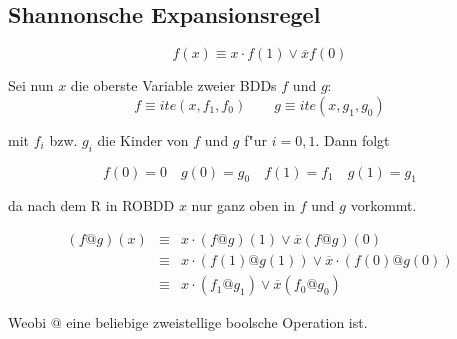 \documentclass[german, 10pt, a4paper, twocolumn]{scrartcl}
\theoremstyle{definition}
\begin{document}
\subsection{Shannonsche Expansionsregel}

\begin{displaymath}
	f(x) \equiv x \cdotp f(1) \lor \overline{x} f(0)
\end{displaymath}

Sei nun $x$ die oberste Variable zweier BDDs $f$ und $g$:
\begin{displaymath}
	f \equiv ite(x,f_1,f_0) \qquad g \equiv ite(x,g_1,g_0)
\end{displaymath}

mit $f_i$ bzw. $g_i$ die Kinder von $f$ und $g$ f"ur $i=0,1$. Dann folgt

\begin{displaymath}
	f(0) = 0 \quad g(0) = g_0 \quad f(1) = f_1 \quad g(1) = g_1
\end{displaymath}

da nach dem R in ROBDD $x$ nur ganz oben in $f$ und $g$ vorkommt.

\begin{eqnarray}
	(f @ g) (x) &	\equiv &	x \cdotp (f @ g)(1) \lor \overline{x}(f @ g)(0)\\
	&		\equiv &	x \cdotp (f(1)@ g(1))\lor \overline{x}\cdotp (f(0) @ g(0))\\
	&		\equiv &	x \cdotp (f_1 @ g_1) \lor \overline{x} (f_0 @ g_0)
\end{eqnarray}

Weobi $@$ eine beliebige zweistellige boolsche Operation ist.
\end{document}
